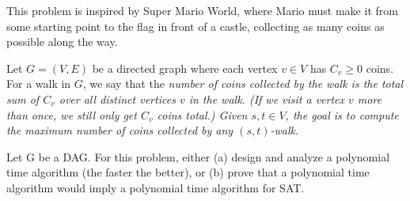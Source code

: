 \documentclass{article}
\begin{document}
\setcounter{section}{12}
\setcounter{exercise}{15}
 
This problem is inspired by Super Mario World, where Mario must make it from some starting point to the flag in front of a castle, collecting as many coins as possible along the way.

Let \( G = (V,E) \) be a directed graph where each vertex \( v \in V \) has \( C_v \geq 0 \) coins.
For a walk in \( G \), we say that the \it{number of coins collected by the walk} is the total sum of \( C_v \) over all \it{distinct} vertices \( v \) in the walk.
(If we visit a vertex \( v \) more than once, we still only get \( C_v \) coins total.)
Given \( s, t \in V \), the goal is to compute the maximum number of coins collected by any \( (s, t) \)-walk.




\begin{subexercise} \label{mario-dag}
Let G be a DAG.
For this problem, either (a) design and analyze a polynomial time algorithm (the faster the better), or (b) prove that a polynomial time algorithm would imply a polynomial time algorithm for SAT.
\end{subexercise}
\end{document}
